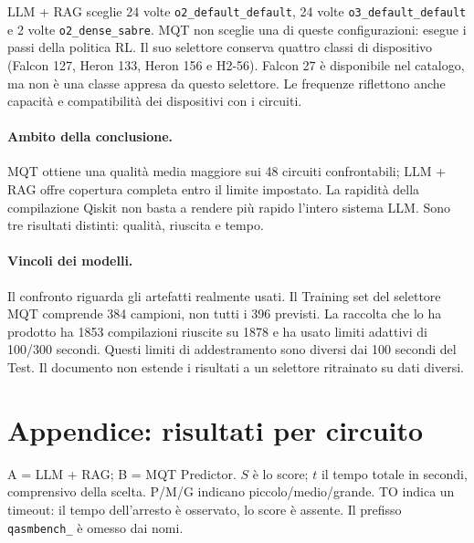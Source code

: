 \documentclass[11pt,a4paper]{article}
\renewcommand{\arraystretch}{1.2}
\begin{document}
LLM + RAG sceglie 24 volte \texttt{o2\_default\_default}, 24 volte
\texttt{o3\_default\_default} e 2 volte \texttt{o2\_dense\_sabre}.
MQT non sceglie una di queste configurazioni: esegue i passi della politica RL.
Il suo selettore conserva quattro classi di dispositivo (Falcon 127, Heron 133,
Heron 156 e H2-56). Falcon 27 è disponibile nel catalogo, ma non è una classe
appresa da questo selettore. Le frequenze riflettono anche capacità e compatibilità
dei dispositivi con i circuiti.

\paragraph{Ambito della conclusione.}
MQT ottiene una qualità media maggiore sui 48 circuiti confrontabili; LLM + RAG
offre copertura completa entro il limite impostato. La rapidità della compilazione
Qiskit non basta a rendere più rapido l'intero sistema LLM.
Sono tre risultati distinti: qualità, riuscita e tempo.

\paragraph{Vincoli dei modelli.}
Il confronto riguarda gli artefatti realmente usati. Il Training set del selettore
MQT comprende 384 campioni, non tutti i 396 previsti. La raccolta che lo ha prodotto
ha 1853 compilazioni riuscite su 1878 e ha usato limiti adattivi di 100/300 secondi.
Questi limiti di addestramento sono diversi dai 100 secondi del Test. Il documento
non estende i risultati a un selettore ritrainato su dati diversi.


\clearpage\section{Appendice: risultati per circuito}

A = LLM + RAG; B = MQT Predictor. $S$ è lo score; $t$ il tempo totale
in secondi, comprensivo della scelta. P/M/G indicano piccolo/medio/grande.
TO indica un timeout: il tempo dell'arresto è osservato, lo score è assente.
Il prefisso \texttt{qasmbench\_} è omesso dai nomi.

\begingroup\footnotesize\renewcommand{\arraystretch}{1.45}
\end{document}
